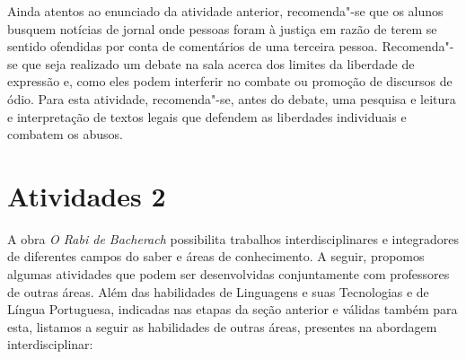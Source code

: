 \documentclass[12pt]{extarticle}
\begin{document}


Ainda atentos ao enunciado da atividade anterior,
recomenda"-se que os alunos busquem notícias de jornal onde pessoas foram
à justiça em razão de terem se sentido ofendidas por conta de
comentários de uma terceira pessoa. Recomenda"-se que seja realizado um
debate na sala acerca dos limites da liberdade de expressão e, como eles
podem interferir no combate ou promoção de discursos de ódio. Para esta
atividade, recomenda"-se, antes do debate, uma pesquisa e leitura e
interpretação de textos legais que defendem as liberdades individuais e
combatem os abusos.

\section{Atividades 2}

A obra \emph{O Rabi de Bacherach} possibilita trabalhos
interdisciplinares e integradores de diferentes campos do saber e áreas
de conhecimento. A seguir, propomos algumas atividades que podem ser
desenvolvidas conjuntamente com professores de outras áreas. Além das
habilidades de Linguagens e suas Tecnologias e de Língua Portuguesa,
indicadas nas etapas da seção anterior e válidas também para esta,
listamos a seguir as habilidades de outras áreas, presentes na abordagem
interdisciplinar:
\end{document}
